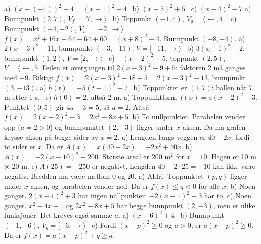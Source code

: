  a) $(x - (-1))^2 + 4 = (x+1)^2 + 4$ \ b) $(x - 5)^2 + 5$ \ c) $(x - 4)^2 - 7$
 a) Bunnpunkt $(2, 7)$, $V_f = [7, \rightarrow\rangle$ \ b) Toppunkt $(-1, 4)$, $V_g = \langle\leftarrow, 4]$ \ c) Bunnpunkt $(-4, -2)$, $V_h = [-2, \rightarrow\rangle$
 $f(x) = x^2 + 16x + 64 - 64 + 60 = (x + 8)^2 - 4$. Bunnpunkt $(-8, -4)$.
 a) $2(x + 3)^2 - 11$, bunnpunkt $(-3, -11)$, $V = [-11, \rightarrow\rangle$ \ b) $3(x - 1)^2 + 2$, bunnpunkt $(1, 2)$, $V = [2, \rightarrow\rangle$ \ c) $-(x - 2)^2 + 5$, toppunkt $(2, 5)$, $V = \langle\leftarrow, 5]$
 Feilen er overgangen til $2(x-3)^2 - 9 + 5$: faktoren 2 må ganges med $-9$. Riktig: $f(x) = 2(x - 3)^2 - 18 + 5 = 2(x-3)^2 - 13$, bunnpunkt $(3, -13)$.
 a) $h(t) = -5(t - 1)^2 + 7$ \ b) Toppunktet er $(1, 7)$: ballen når 7 m etter 1 s. \ c) $h(0) = 2$, altså 2 m.
 a) Toppunktform $f(x) = a(x - 2)^2 - 3$. Punktet $(0, 5)$ gir $4a - 3 = 5$, så $a = 2$. Altså $f(x) = 2(x - 2)^2 - 3 = 2x^2 - 8x + 5$.
b) To nullpunkter. Parabelen vender opp ($a = 2 > 0$) og bunnpunktet $(2, -3)$ ligger under $x$-aksen. Da må grafen krysse aksen på begge sider av $x = 2$.
 a) Lengden langs veggen er $40 - 2x$, fordi to sider er $x$. Da er $A(x) = x(40 - 2x) = -2x^2 + 40x$.
b) $A(x) = -2(x - 10)^2 + 200$. Største areal er $200\text{ m}^2$ for $x = 10$. Hagen er 10 m $\times$ 20 m.
c) $A(25) = -250$ er negativt. Lengden $40 - 2 \cdot 25 = -10$ kan ikke være negativ. Bredden må være mellom 0 og 20.
 a) Aldri. Toppunktet $(p, q)$ ligger under $x$-aksen, og parabelen vender ned. Da er $f(x) \le q < 0$ for alle $x$.
b) Noen ganger. $2(x - 1)^2 + 3$ har ingen nullpunkter. $-2(x - 1)^2 + 3$ har to.
c) Noen ganger. $x^2 - 4x + 1$ og $2x^2 - 8x + 5$ har begge bunnpunkt $(2, -3)$, men er ulike funksjoner. Det kreves også samme $a$.
 a) $(x - 6)^2 + 4$ \ b) Bunnpunkt $(-1, -6)$, $V_g = [-6, \rightarrow\rangle$ \ c) Fordi $(x - p)^2 \ge 0$ og $a > 0$, er $a(x - p)^2 \ge 0$. Da er $f(x) = a(x-p)^2 + q \ge q$.

